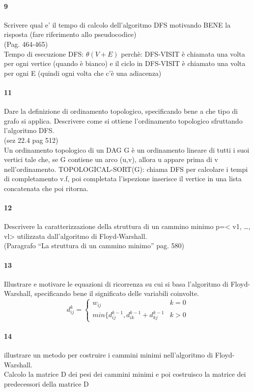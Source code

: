 \documentclass[12pt, a4paper, openany]{book}
\begin{document}
\paragraph{9}
Scrivere qual e’ il tempo di calcolo dell’algoritmo DFS motivando BENE la
risposta (fare riferimento allo pseudocodice)\\
(Pag. 464-465)\\
Tempo di esecuzione DFS: $\theta(V+E)$ perchè: DFS-VISIT è chiamata una volta per ogni vertice (quando è bianco) e il ciclo in DFS-VISIT è chiamato una volta per ogni E (quindi ogni volta che c'è una adiacenza)
\paragraph{11}
Dare la definizione di ordinamento topologico, specificando bene a che tipo di
grafo si applica. Descrivere come si ottiene l’ordinamento topologico
sfruttando l’algoritmo DFS.\\
(sez 22.4 pag 512)\\
Un ordinamento topologico di un DAG G è un ordinamento lineare di tutti i suoi vertici tale che, se G contiene un arco (u,v), allora u appare prima di v nell'ordinamento.
TOPOLOGICAL-SORT(G): chiama DFS per calcolare i tempi di completamento v.f, poi completata l'ispezione inserisce il vertice in una lista concatenata che poi ritorna.

\paragraph{12}
Descrivere la caratterizzazione della struttura di un cammino minimo p=< v1,
…, vl> utilizzata dall’algoritmo di Floyd-Warshall.\\
(Paragrafo “La struttura di un cammino minimo” pag. 580)\\
\paragraph{13}
Illustrare e motivare le equazioni di ricorrenza su cui si basa l’algoritmo di
Floyd-Warshall, specificando bene il significato delle variabili coinvolte.
\begin{equation*}
	d_{ij}^k = \begin{cases}
		w_{ij}                                        & k=0 \\
		min\{d_{ij}^{k-1},d_{ik}^{k-1} + d_{kj}^{k-1} & k>0
	\end{cases}
\end{equation*}
\paragraph{14}
illustrare un metodo per costruire i cammini minimi nell’algoritmo di Floyd-Warshall.\\
Calcolo la matrice D dei pesi dei cammini minimi e poi costruisco la matrice dei predecessori della matrice D
\end{document}
